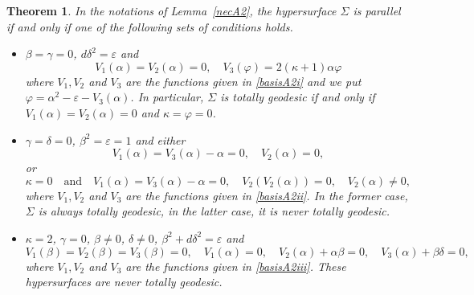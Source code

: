 \documentclass{amsart}
\theoremstyle{plain}
\newtheorem{theorem}{Theorem}
\theoremstyle{remark}
\begin{document}
{\begin{theorem}\label{parA2}
In the notations of Lemma~{\rm\ref{necA2}}, the hypersurface $\Sigma$ is parallel if and only if one of the following sets of conditions holds.
\begin{itemize}
\item[(1)]  $\beta=\gamma=0$, $d\delta^2 = \varepsilon$ and
\[
V_1(\alpha)=V_2(\alpha)=0, \quad V_3(\varphi) = 2(\kappa+1)\alpha \varphi
\]
where $V_1,V_2$ and $V_3$ are the functions given in \eqref{basisA2i} and we put $\varphi = \alpha^2- \varepsilon -V_3(\alpha)$. In particular, $\Sigma$ is totally geodesic if and only if $V_1(\alpha) = V_2(\alpha) =0$ and $\kappa=\varphi = 0$.
\vspace{1mm} 
\item[(2)] $\gamma=\delta=0$, $\beta^2=\varepsilon=1$ and either
\[
V_1(\alpha)=V_3(\alpha)-\alpha=0,\quad V_2(\alpha) =0,
\]
or
\[
\kappa=0 \quad \mbox{and} \quad V_1(\alpha)=V_3(\alpha)-\alpha=0, \quad V_2(V_2(\alpha)) =0, \quad V_2(\alpha) \neq 0,
\]
where $V_1,V_2$ and $V_3$ are the functions given in \eqref{basisA2ii}. In the former case, $\Sigma$ is always totally geodesic, in the latter case, it is never totally geodesic.
\vspace{1mm} 
\item[(3)] $\kappa=2$, $\gamma =0$, $\beta\neq 0$, $\delta\neq 0$, $\beta^2+d\delta^2 = \varepsilon$ and
\[
V_1(\beta)=V_2(\beta) = V_3(\beta) = 0,\quad V_1(\alpha) = 0,\quad V_2(\alpha)+\alpha\beta = 0,\quad V_3(\alpha)+\beta\delta =0,
\]
where $V_1,V_2$ and $V_3$ are the functions given in \eqref{basisA2iii}. These hypersurfaces are never totally geodesic.
\end{itemize}
\end{theorem} 

}
\end{document}

